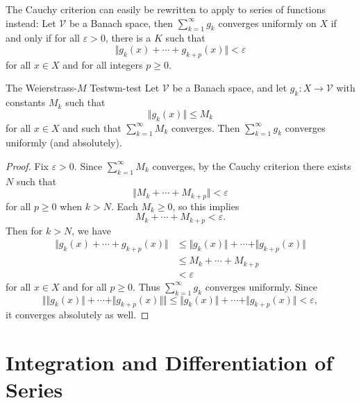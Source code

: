 \documentclass[10pt]{report}
\begin{document}
The Cauchy criterion can easily be rewritten to apply to series of functions instead: Let $\mathcal{V}$ be a Banach space, then $\sum_{k=1}^{\infty} g_k$ converges uniformly on $X$ if and only if for all $\varepsilon>0$, there is a $K$ such that
\[
	\Vert{g_k(x) + \cdots + g_{k+p}(x)}\Vert< \varepsilon
\] for all $x \in X$ and for all integers $p \geq 0$.

\begin{thrm}{The Weierstrass-$M$ Test}{wm-test}
	Let $\mathcal{V}$ be a Banach space, and let $g_k : X \to \mathcal{V}$ with constants $M_k$ such that
	\[
		\Vert{g_k(x)}\Vert\leq M_k
	\] for all $x \in X$ and such that $\sum_{k=1}^{\infty} M_k$ converges. Then $\sum_{k=1}^{\infty} g_k$ converges uniformly (and absolutely).
\end{thrm}
\begin{proof}
	Fix $\varepsilon>0$. Since $\sum_{k=1}^{\infty} M_k$ converges, by the Cauchy criterion there exists $N$ such that
	\[
	\Vert{M_k + \cdots + M_{k+p}}\Vert< \varepsilon
	\] for all $p \geq 0$ when $k > N$. Each $M_k \geq 0$, so this implies
	\[
	M_k + \cdots + M_{k+p} < \varepsilon.
	\] Then for $k>N$, we have
	\begin{align*}
		\Vert{g_k(x) + \cdots + g_{k+p}(x)}\Vert &\leq \Vert{g_k(x)}\Vert + \cdots + \Vert{g_{k+p}(x)}\Vert \\
		&\leq M_k + \cdots + M_{k+p}\\
		&< \varepsilon
	\end{align*}
	for all $x \in X$ and for all $p \geq 0$. Thus $\sum_{k=1}^{\infty} g_k$ converges uniformly. Since
	\[
		\big\Vert{\Vert{g_k(x)}\Vert + \cdots + \Vert{g_{k+p}(x)}\Vert}\big\Vert \leq \Vert{g_k(x)}\Vert + \cdots + \Vert{g_{k+p}(x)}\Vert < \varepsilon,
	\] it converges absolutely as well.
\end{proof}


\section{Integration and Differentiation of Series}
\end{document}
